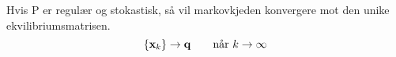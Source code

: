 Hvis P er regulær og stokastisk,
så vil markovkjeden konvergere mot den unike ekvilibriumsmatrisen.
$$\{\vecx_k\}\to\vecq \qquad \text{når}\ k\to\infty$$
